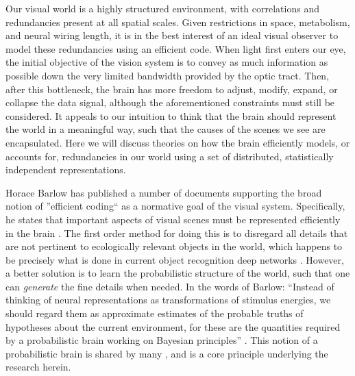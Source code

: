 Our visual world is a highly structured environment, with correlations and redundancies present at all spatial scales. Given restrictions in space, metabolism, and neural wiring length, it is in the best interest of an ideal visual observer to model these redundancies using an efficient code. When light first enters our eye, the initial objective of the vision system is to convey as much information as possible down the very limited bandwidth provided by the optic tract. Then, after this bottleneck, the brain has more freedom to adjust, modify, expand, or collapse the data signal, although the aforementioned constraints must still be considered. It appeals to our intuition to think that the brain should represent the world in a meaningful way, such that the causes of the scenes we see are encapsulated. Here we will discuss theories on how the brain efficiently models, or accounts for, redundancies in our world using a set of distributed, statistically independent representations.


Horace Barlow has published a number of documents supporting the broad notion of ''efficient coding`` as a normative goal of the visual system. Specifically, he states that important aspects of visual scenes must be represented efficiently in the brain \parencite{barlow2001redundancy}. The first order method for doing this is to disregard all details that are not pertinent to ecologically relevant objects in the world, which happens to be precisely what is done in current object recognition deep networks \parencite{tishby2015deep}. However, a better solution is to learn the probabilistic structure of the world, such that one can \textit{generate} the fine details when needed. In the words of Barlow: ``Instead of thinking of neural representations as transformations of stimulus energies, we should regard them as approximate estimates of the probable truths of hypotheses about the current environment, for these are the quantities required by a probabilistic brain working on Bayesian principles'' \parencite{barlow2001redundancy}. This notion of a probabilistic brain is shared by many \parencite{kersten2004object, lee2003hierarchical, lewicki1997bayesian, olshausen2013perception}, and is a core principle underlying the research herein.

